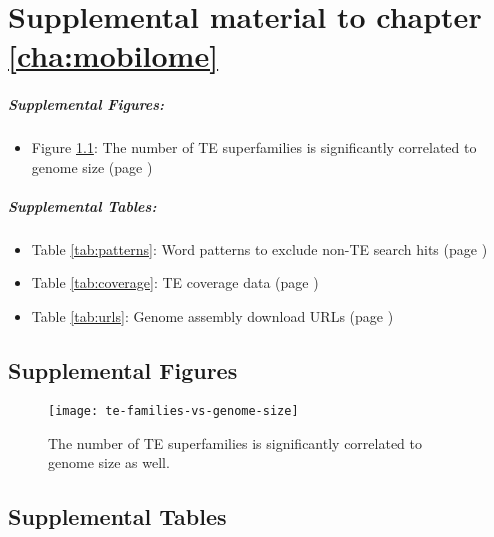 \chapter{Supplemental material to chapter \ref{cha:mobilome}}

\paragraph{Supplemental Figures:}

\begin{itemize}
	\item Figure \ref{fig:te-families-vs-genome-size}: The number of TE superfamilies is significantly correlated to genome size (page \pageref{fig:te-families-vs-genome-size})
\end{itemize}

\paragraph{Supplemental Tables:}

\begin{itemize}
	\item Table \ref{tab:patterns}: Word patterns to exclude non-TE search hits (page \pageref{tab:patterns})
	\item Table \ref{tab:coverage}: TE coverage data (page \pageref{tab:coverage})
	\item Table \ref{tab:urls}: Genome assembly download URLs (page \pageref{tab:urls})
\end{itemize}

\section{Supplemental Figures}

\begin{figure}[h]
\centering
\texttt{[image: te-families-vs-genome-size]}
\caption[The number of TE superfamilies is significantly correlated to
genome size]{The number of TE superfamilies is significantly correlated to
genome size as well.}
\label{fig:te-families-vs-genome-size}
\end{figure}


\clearpage

\section{Supplemental Tables}

